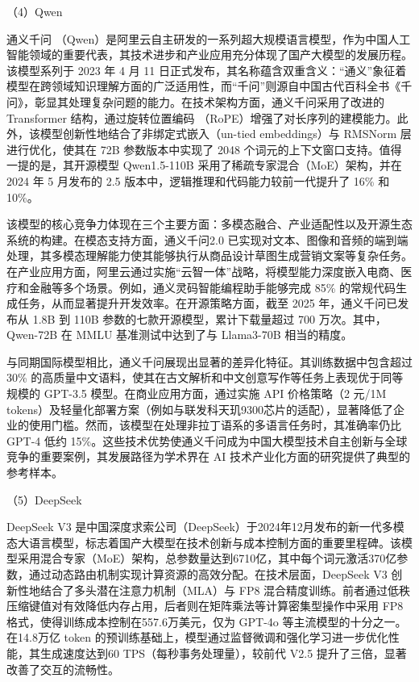 （4）Qwen
\label{sec:TOSWT-gen-qwen}

通义千问 \cite{qwen2025qwen25technicalreport}（Qwen）是阿里云自主研发的一系列超大规模语言模型，作为中国人工智能领域的重要代表，其技术进步和产业应用充分体现了国产大模型的发展历程。该模型系列于 2023 年 4 月 11 日正式发布，其名称蕴含双重含义：“通义”象征着模型在跨领域知识理解方面的广泛适用性，而“千问”则源自中国古代百科全书《千问》，彰显其处理复杂问题的能力。在技术架构方面，通义千问采用了改进的 Transformer 结构，通过旋转位置编码 \cite{su2023roformerenhancedtransformerrotary}（RoPE）增强了对长序列的建模能力。此外，该模型创新性地结合了非绑定式嵌入（un-tied embeddings）与 RMSNorm 层进行优化，使其在 72B 参数版本中实现了 2048 个词元的上下文窗口支持。值得一提的是，其开源模型 Qwen1.5-110B 采用了稀疏专家混合（MoE）架构，并在 2024 年 5 月发布的 2.5 版本中，逻辑推理和代码能力较前一代提升了 16\% 和 10\%。

该模型的核心竞争力体现在三个主要方面：多模态融合、产业适配性以及开源生态系统的构建。在模态支持方面，通义千问2.0 已实现对文本、图像和音频的端到端处理，其多模态理解能力使其能够执行从商品设计草图生成营销文案等复杂任务。在产业应用方面，阿里云通过实施“云智一体”战略，将模型能力深度嵌入电商、医疗和金融等多个场景。例如，通义灵码智能编程助手能够完成 85\% 的常规代码生成任务，从而显著提升开发效率。在开源策略方面，截至 2025 年，通义千问已发布从 1.8B 到 110B 参数的七款开源模型，累计下载量超过 700 万次。其中，Qwen-72B 在 MMLU 基准测试中达到了与 Llama3-70B 相当的精度。

与同期国际模型相比，通义千问展现出显著的差异化特征。其训练数据中包含超过 30\% 的高质量中文语料，使其在古文解析和中文创意写作等任务上表现优于同等规模的 GPT-3.5 模型。在商业应用方面，通过实施 API 价格策略（2 元/1M tokens）及轻量化部署方案（例如与联发科天玑9300芯片的适配），显著降低了企业的使用门槛。然而，该模型在处理非拉丁语系的多语言任务时，其准确率仍比 GPT-4 低约 15\%。这些技术优势使通义千问成为中国大模型技术自主创新与全球竞争的重要案例，其发展路径为学术界在 AI 技术产业化方面的研究提供了典型的参考样本。

（5）DeepSeek
\label{sec:TOSWT-gen-ds}

DeepSeek V3 \cite{deepseekai2024deepseekv3technicalreport} 是中国深度求索公司（DeepSeek）于2024年12月发布的新一代多模态大语言模型，标志着国产大模型在技术创新与成本控制方面的重要里程碑。该模型采用混合专家（MoE）架构，总参数量达到6710亿，其中每个词元激活370亿参数，通过动态路由机制实现计算资源的高效分配。在技术层面，DeepSeek V3 创新性地结合了多头潜在注意力机制（MLA）与 FP8 混合精度训练。前者通过低秩压缩键值对有效降低内存占用，后者则在矩阵乘法等计算密集型操作中采用 FP8 格式，使得训练成本控制在557.6万美元，仅为 GPT-4o 等主流模型的十分之一。在14.8万亿 token 的预训练基础上，模型通过监督微调和强化学习进一步优化性能，其生成速度达到60 TPS（每秒事务处理量），较前代 V2.5 提升了三倍，显著改善了交互的流畅性。


